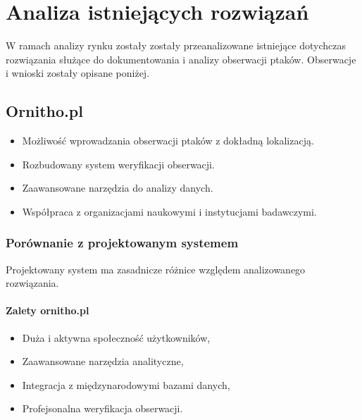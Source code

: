 %


\chapter{Analiza istniejących rozwiązań}
\label{rozdzial0}

W ramach analizy rynku zostały zostały przeanalizowane istniejące dotychczas rozwiązania służące do dokumentowania i analizy obserwacji ptaków. 
Obserwacje i wnioski zostały opisane poniżej.

\section{Ornitho.pl}
\begin{itemize}
	\item Możliwość wprowadzania obserwacji ptaków z dokładną lokalizacją.
	\item Rozbudowany system weryfikacji obserwacji.
	\item Zaawansowane narzędzia do analizy danych.
	\item Współpraca z organizacjami naukowymi i instytucjami badawczymi.
\end{itemize}

\subsection{Porównanie z projektowanym systemem}
Projektowany system ma zasadnicze różnice względem analizowanego rozwiązania.

\subsubsection{Zalety ornitho.pl}
\begin{itemize}
	\item Duża i aktywna społeczność użytkowników,
	\item Zaawansowane narzędzia analityczne,
	\item Integracja z międzynarodowymi bazami danych,
	\item Profejsonalna weryfikacja obserwacji.
\end{itemize}

